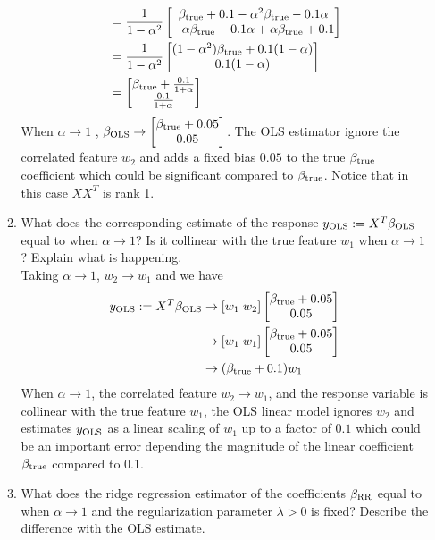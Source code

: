 \documentclass[12pt,twoside]{article}
\begin{document}
\begin{enumerate}
\begin{enumerate}
\begin{align*}
						&= 	\frac{1}{1-\alpha^2}  \begin{bmatrix} \beta_{\operatorname{true}} + 0.1 -\alpha^2 \beta_{\operatorname{true}} -0.1 \alpha \\ -\alpha \beta_{\operatorname{true}} -0.1 \alpha + \alpha \beta_{\operatorname{true}}  + 0.1 \end{bmatrix} \\
						&=	\frac{1}{1-\alpha^2}  \begin{bmatrix} (1-\alpha^2)  \beta_{\operatorname{true}} + 0.1 (1-\alpha) \\ 0.1 (1 - \alpha) \end{bmatrix} \\
						&=  	\begin{bmatrix} \beta_{\operatorname{true}} + \frac{0.1} {1 + \alpha} \\ \frac{0.1} {1 + \alpha} \end{bmatrix}
\end{align*}
When $\alpha \rightarrow 1$ , $\beta_{\operatorname{OLS}} \rightarrow   \begin{bmatrix} \beta_{\operatorname{true}} + 0.05  \\ 0.05 \end{bmatrix}$.
The OLS estimator ignore the correlated feature $w_2$ and adds a fixed bias $0.05$ to the true $\beta_{\operatorname{true}}$ coefficient which could be significant compared to
 $\beta_{\operatorname{true}}$. Notice that in this case $XX^T$ is rank 1.
    
   \item  What does the corresponding estimate of the response $y_{\operatorname{OLS}} := X^T\beta_{\operatorname{OLS}}$ equal to when $\alpha \rightarrow 1$? Is it collinear with the true feature $w_1$ when $\alpha \rightarrow 1$? Explain what is happening.\\
   
  \medskip
  Taking $\alpha \rightarrow 1$, $w_2 \rightarrow w_1$ and we have 
  \begin{align*}
	  y_{\operatorname{OLS}} := X^T\beta_{\operatorname{OLS}}	&\rightarrow [w_1 \; w_2]  \begin{bmatrix} \beta_{\operatorname{true}} + 0.05  \\ 0.05 \end{bmatrix} \\
	  								&\rightarrow [w_1 \; w_1] \begin{bmatrix} \beta_{\operatorname{true}} + 0.05  \\ 0.05 \end{bmatrix} \\
									&\rightarrow ( \beta_{\operatorname{true}} + 0.1) w_1
  \end{align*}
  When $\alpha \rightarrow 1$, the correlated feature $w_2 \rightarrow w_1$, and the response variable is collinear with the true feature $w_1$, the OLS linear model ignores $w_2$ and estimates $y_{\operatorname{OLS}}$ as a linear scaling of $w_1$ 
  up to a factor of $0.1$ which could be an important error depending the magnitude of the linear coefficient  $\beta_{\operatorname{true}}$ compared to 0.1.
  
  \item What does the ridge regression estimator of the coefficients $\beta_{\operatorname{RR}}$ equal to when $\alpha \rightarrow 1$ and the regularization parameter $\lambda >0$ is fixed? Describe the difference with the OLS estimate.\\
 

\end{enumerate}
\end{enumerate}
\end{document}
